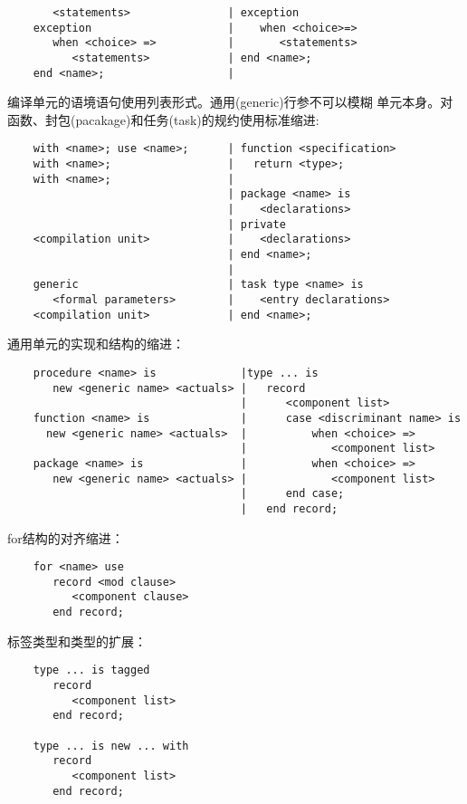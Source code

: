\begin{blockindent}
\begin{lstlisting}
       <statements>               | exception
    exception                     |    when <choice>=>
       when <choice> =>           |       <statements>
          <statements>            | end <name>;
    end <name>;                   |
\end{lstlisting}
编译单元的语境语句使用列表形式。通用(generic)行参不可以模糊
单元本身。对函数、封包(pacakage)和任务(task)的规约使用标准缩进:
\begin{lstlisting}
    with <name>; use <name>;      | function <specification>
    with <name>;                  |   return <type>;
    with <name>;                  |
                                  | package <name> is
                                  |    <declarations>
                                  | private
    <compilation unit>            |    <declarations>
                                  | end <name>;
                                  |
    generic                       | task type <name> is
       <formal parameters>        |    <entry declarations>
    <compilation unit>            | end <name>;

\end{lstlisting}
通用单元的实现和结构的缩进：
\begin{lstlisting}
    procedure <name> is             |type ... is
       new <generic name> <actuals> |   record
                                    |      <component list>
    function <name> is              |      case <discriminant name> is
      new <generic name> <actuals>  |          when <choice> =>
                                    |             <component list>
    package <name> is               |          when <choice> =>
       new <generic name> <actuals> |             <component list>
                                    |      end case;
                                    |   end record;
\end{lstlisting}
for结构的对齐缩进：
\begin{lstlisting}
    for <name> use
       record <mod clause>
          <component clause>
       end record;
\end{lstlisting}
标签类型和类型的扩展：
\begin{lstlisting}
    type ... is tagged
       record
          <component list>
       end record;

    type ... is new ... with
       record
          <component list>
       end record;
\end{lstlisting}
\end{blockindent}

